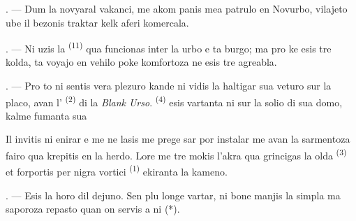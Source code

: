 %

\begin{VUpage}[49]{}
\VUsaut{4.0mm}
\VUsaut{3.0mm}
\VUfilet{16mm}
\VUsaut{5.6mm}
\VUsaut{3.0mm}

\VUsaut{3.0mm}

\VUsaut{4.0mm}

. --- Dum la novyaral vakanci, me akom\cc
panis mea patrulo en Novurbo, vilajeto ube\nl
il bezonis traktar kelk aferi komercala.

. --- Ni uzis la  \textsuperscript{(11)} qua funcionas\nl
inter la urbo e ta burgo; ma pro ke esis tre\nl
kolda, ta voyajo en vehilo poke komfortoza\nl
ne esis tre agreabla.

. --- Pro to ni sentis vera plezuro kande ni\nl
vidis la  haltigar sua veturo sur la\nl
placo, avan l' \textsuperscript{(2)} di la \textit{Blank Urso}. \cc
{} \textsuperscript{(4)} esis vartanta ni sur la solio di sua\nl
domo, kalme fumanta sua 

\VUblancAlinea
Il invitis ni enirar e me ne lasis me prege\cc
sar por instalar me avan la sarmentoza fairo\nl
qua krepitis en la herdo. Lore me tre mokis\nl
l'akra  qua grincigas la olda \cc
{} \textsuperscript{(3)} et forportis per nigra vortici  \textsuperscript{(1)}\nl
ekiranta la kameno.

. --- Esis la horo dil dejuno. Sen plu longe\nl
vartar, ni bone manjis la simpla ma saporoza\nl
repasto quan on servis a ni (*).
\end{VUpage}

